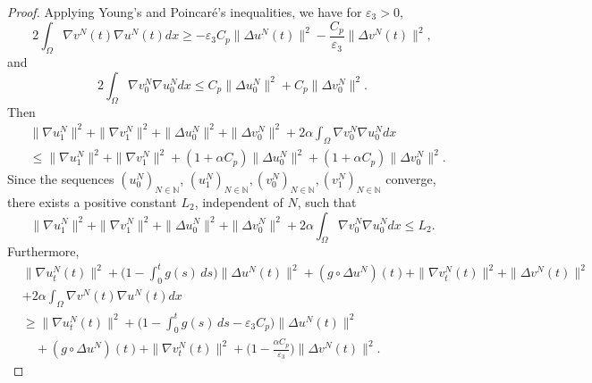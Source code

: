\documentclass[11pt]{article}
\numberwithin{equation}{section}
\begin{document}
\begin{proof}
Applying Young's and Poincar\'e's inequalities, we have for $\varepsilon_{3}> 0$,
 \begin{equation*}
 2\int_{\Omega} \nabla v^N(t) \nabla u^N(t) dx
 \geq - \varepsilon_{3} C_p\| \Delta u^N(t) \|^2 - \frac{C_p}{\varepsilon_{3}}\| \Delta v^N(t) \|^2,
 \end{equation*}
and
\[
 2 \int_{\Omega} \nabla v^N_0 \nabla u^N_0 dx
 \leq C_p\| \Delta u^N_0 \|^2 +C_p \| \Delta v^N_0 \|^2.
\]
Then
\begin{equation}
\begin{aligned}
& \| \nabla u^N_{1} \|^2+ \| \nabla v^N_{1} \|^2+\| \Delta u^N_0 \|^2
 + \| \Delta v^N_0 \|^2 +2 \alpha \int_{\Omega} \nabla v^N_0 \nabla u^N_0 dx \\
&\leq \| \nabla u^N_{1} \|^2+ \| \nabla v^N_{1} \|^2
 +(1+\alpha C_p) \| \Delta u^N_0 \|^2
 +(1+\alpha C_p)\| \Delta v^N_0 \|^2.
\end{aligned} \label{e3.16}
\end{equation}
Since the sequences $ (u_0^N)_{N \in \mathbb{N}}$,
$ (u_1^N)_{N \in \mathbb{N}}, (v_0^N)_{N \in \mathbb{N}}, (v_1^N)_{N \in \mathbb{N}} $
converge, there exists a positive constant $L_2$, independent of $N$, such that
\begin{equation}
 \| \nabla u^N_{1} \|^2+ \| \nabla v^N_{1} \|^2
 +\| \Delta u^N_0 \|^2 + \| \Delta v^N_0 \|^2
 +2 \alpha \int_{\Omega} \nabla v^N_0 \nabla u^N_0 dx\leq L_2. \label{e3.17}
\end{equation}
Furthermore,
\begin{align*}
&\| \nabla u^N_{t}(t) \|^2+\Big( 1 - \int_0^t g(s)\,ds \Big) \| \Delta u^N(t) \|^2
 + (g \circ \Delta u^N)(t) + \| \nabla v^N_{t}(t) \|^2+ \| \Delta v^N (t)\|^2 \\
&+2 \alpha \int_{\Omega} \nabla v^N (t)\nabla u^N(t) dx \\
&\geq \| \nabla u^N_{t}(t) \|^2+\Big( 1 - \int_0^t g(s)\,ds
 - \varepsilon_{3} C_p \Big) \| \Delta u^N(t) \|^2 \\
&\quad + (g \circ \Delta u^N)(t) + \| \nabla v^N_{t}(t) \|^2
 +\Big( 1-\frac{\alpha C_p}{\varepsilon_{3}}\Big) \| \Delta v^N(t) \|^2.
\end{align*}


\end{proof}
\end{document}

